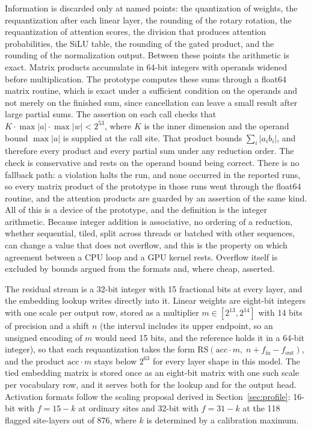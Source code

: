 \documentclass[11pt]{article}
\begin{document}
Information is discarded only at named points: the quantization of weights, the requantization after each linear layer, the rounding of the rotary rotation, the requantization of attention scores, the division that produces attention probabilities, the SiLU table, the rounding of the gated product, and the rounding of the normalization output. Between these points the arithmetic is exact. Matrix products accumulate in 64-bit integers with operands widened before multiplication. The prototype computes these sums through a float64 matrix routine, which is exact under a sufficient condition on the operands and not merely on the finished sum, since cancellation can leave a small result after large partial sums. The assertion on each call checks that $K\cdot\max|a|\cdot\max|w|<2^{53}$, where $K$ is the inner dimension and the operand bound $\max|a|$ is supplied at the call site. That product bounds $\sum_i|a_ib_i|$, and therefore every product and every partial sum under any reduction order. The check is conservative and rests on the operand bound being correct. There is no fallback path: a violation halts the run, and none occurred in the reported runs, so every matrix product of the prototype in those runs went through the float64 routine, and the attention products are guarded by an assertion of the same kind. All of this is a device of the prototype, and the definition is the integer arithmetic. Because integer addition is associative, no ordering of a reduction, whether sequential, tiled, split across threads or batched with other sequences, can change a value that does not overflow, and this is the property on which agreement between a CPU loop and a GPU kernel rests. Overflow itself is excluded by bounds argued from the formats and, where cheap, asserted.

The residual stream is a 32-bit integer with 15 fractional bits at every layer, and the embedding lookup writes directly into it. Linear weights are eight-bit integers with one scale per output row, stored as a multiplier $m\in[2^{13},2^{14}]$ with 14 bits of precision and a shift $n$ (the interval includes its upper endpoint, so an unsigned encoding of $m$ would need 15 bits, and the reference holds it in a 64-bit integer), so that each requantization takes the form $\mathrm{RS}(\mathrm{acc}\cdot m,\; n+f_{\mathrm{in}}-f_{\mathrm{out}})$, and the product $\mathrm{acc}\cdot m$ stays below $2^{63}$ for every layer shape in this model. The tied embedding matrix is stored once as an eight-bit matrix with one such scale per vocabulary row, and it serves both for the lookup and for the output head. Activation formats follow the scaling proposal derived in Section~\ref{sec:profile}: 16-bit with $f=15-k$ at ordinary sites and 32-bit with $f=31-k$ at the 118 flagged site-layers out of 876, where $k$ is determined by a calibration maximum.
\end{document}

